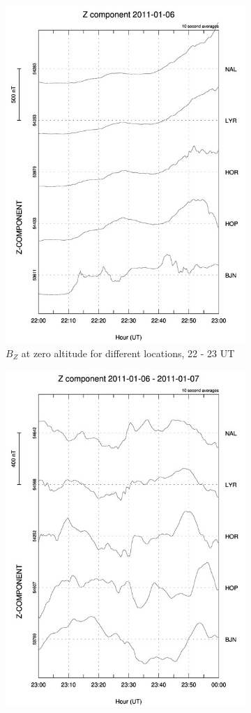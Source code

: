 \documentclass[10pt,a4paper]{article}
\begin{document}
\begin{figure}[h]
\begin{subfigure}[h]{.5\textwidth}
		\includegraphics[width=.8\linewidth]{Z_gram5.jpg}
		\caption{$B_Z$ at zero altitude for different locations, 22 - 23 UT}
		\label{mag6}
	\end{subfigure}
	\begin{subfigure}[h]{.5\textwidth}
		\centering
		\includegraphics[width=.8\linewidth]{Z_gram6.jpg}

\end{subfigure}
\end{figure}
\end{document}
